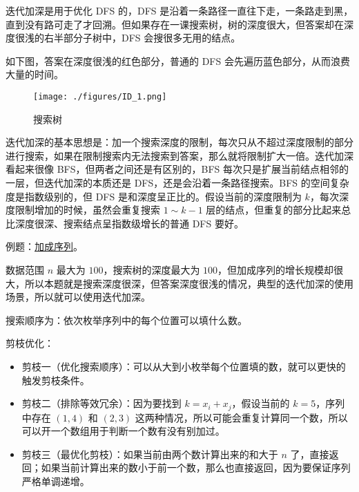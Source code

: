 

\begin{issues}
\issueDraft
\end{issues}

迭代加深是用于优化 DFS 的，DFS 是沿着一条路径一直往下走，一条路走到黑，直到没有路可走了才回溯。但如果存在一课搜索树，树的深度很大，但答案却在深度很浅的右半部分子树中，DFS 会搜很多无用的结点。

如下图，答案在深度很浅的红色部分，普通的 DFS 会先遍历蓝色部分，从而浪费大量的时间。

\begin{figure}[ht]
\centering
\texttt{[image: ./figures/ID\_1.png]}
\caption{搜索树} \label{ID_fig1}
\end{figure}

迭代加深的基本思想是：加一个搜索深度的限制，每次只从不超过深度限制的部分进行搜索，如果在限制搜索内无法搜索到答案，那么就将限制扩大一倍。迭代加深看起来很像 BFS，但两者之间还是有区别的，BFS 每次只是扩展当前结点相邻的一层，但迭代加深的本质还是 DFS，还是会沿着一条路径搜索。BFS 的空间复杂度是指数级别的，但 DFS 是和深度呈正比的。假设当前的深度限制为 $k$，每次深度限制增加的时候，虽然会重复搜索 $1 \sim k - 1$ 层的结点，但重复的部分比起来总比深度很深、搜索结点呈指数级增长的普通 DFS 要好。

例题：\href{http://poj.org/problem?id=2248}{加成序列}。

数据范围 $n$ 最大为 $100$，搜索树的深度最大为 $100$，但加成序列的增长规模却很大，所以本题就是搜索深度很深，但答案深度很浅的情况，典型的迭代加深的使用场景，所以就可以使用迭代加深。

搜索顺序为：依次枚举序列中的每个位置可以填什么数。

剪枝优化：
\begin{itemize}
\item 剪枝一（优化搜索顺序）：可以从大到小枚举每个位置填的数，就可以更快的触发剪枝条件。
\item 剪枝二（排除等效冗余）：因为要找到 $k = x_i + x_j$，假设当前的 $k = 5$，序列中存在 $(1, 4)$ 和 $(2, 3)$ 这两种情况，所以可能会重复计算同一个数，所以可以开一个数组用于判断一个数有没有别加过。
\item 剪枝三（最优化剪枝）：如果当前由两个数计算出来的和大于 $n$ 了，直接返回；如果当前计算出来的数小于前一个数，那么也直接返回，因为要保证序列严格单调递增。
\end{itemize}